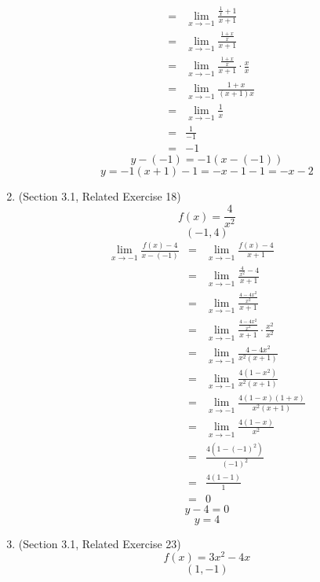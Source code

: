 \documentclass{article}
\begin{document}
\begin{enumerate}
\begin{eqnarray}
        &=& \lim_{x \to -1}{\frac{\frac{1}{x} + 1}{x + 1}} \\
        &=& \lim_{x \to -1}{\frac{\frac{1+x}{x}}{x + 1}} \\
        &=& \lim_{x \to -1}{\frac{\frac{1+x}{x}}{x + 1} \cdot \frac{x}{x}} \\
        &=& \lim_{x \to -1}{\frac{1+x}{(x + 1)x}} \\
        &=& \lim_{x \to -1}{\frac{1}{x}} \\
        &=& \frac{1}{-1} \\
        &=& -1
    \end{eqnarray}
    $$y - (-1) = -1(x - (-1))$$
    $$y = -1(x + 1) - 1 = -x - 1 - 1 = -x - 2$$
    \item (Section 3.1, Related Exercise 18)
    $$f(x) = \frac{4}{x^2}$$
    $$(-1, 4)$$
    \begin{eqnarray}
        \lim_{x \to -1}{\frac{f(x) - 4}{x - (-1)}} &=& \lim_{x \to -1}{\frac{f(x) - 4}{x + 1}} \\
                                                 &=& \lim_{x \to -1}{\frac{\frac{4}{x^2} - 4}{x + 1}} \\
                                                 &=& \lim_{x \to -1}{\frac{\frac{4 - 4x^2}{x^2}}{x + 1}} \\
                                                 &=& \lim_{x \to -1}{\frac{\frac{4 - 4x^2}{x^2}}{x + 1} \cdot \frac{x^2}{x^2}} \\
                                                 &=& \lim_{x \to -1}{\frac{4 - 4x^2}{x^2(x + 1)}} \\
                                                 &=& \lim_{x \to -1}{\frac{4(1 - x^2)}{x^2(x + 1)}} \\
                                                 &=& \lim_{x \to -1}{\frac{4(1 - x)(1 + x)}{x^2(x + 1)}} \\
                                                 &=& \lim_{x \to -1}{\frac{4(1 - x)}{x^2}} \\
                                                 &=& \frac{4(1 - (-1)^2)}{(-1)^2} \\
                                                 &=& \frac{4(1 - 1)}{1} \\
                                                 &=& 0
    \end{eqnarray}
    $$y - 4 = 0$$
    $$y = 4$$
    \item (Section 3.1, Related Exercise 23)
    $$f(x) = 3x^2 - 4x$$
    $$(1, -1)$$
    \begin{eqnarray}

\end{eqnarray}
\end{enumerate}
\end{document}
